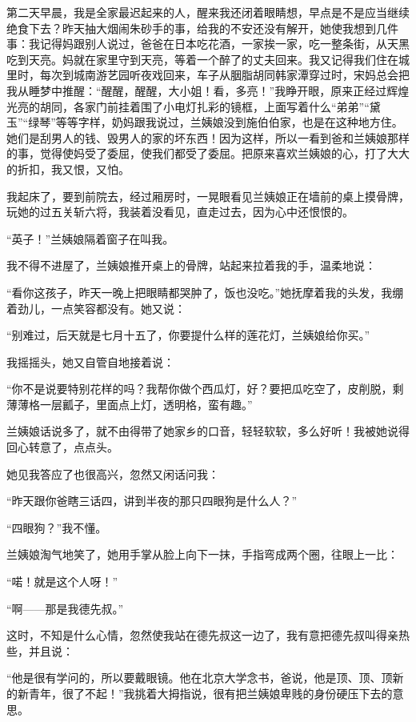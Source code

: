 \par 第二天早晨，我是全家最迟起来的人，醒来我还闭着眼睛想，早点是不是应当继续绝食下去？昨天抽大烟闹朱砂手的事，给我的不安还没有解开，她使我想到几件事：我记得妈跟别人说过，爸爸在日本吃花酒，一家挨一家，吃一整条街，从天黑吃到天亮。妈就在家里守到天亮，等着一个醉了的丈夫回来。我又记得我们住在城里时，每次到城南游艺园听夜戏回来，车子从胭脂胡同韩家潭穿过时，宋妈总会把我从睡梦中推醒：“醒醒，醒醒，大小姐！看，多亮！”我睁开眼，原来正经过辉煌光亮的胡同，各家门前挂着围了小电灯扎彩的镜框，上面写着什么“弟弟”“黛玉”“绿琴”等等字样，奶妈跟我说过，兰姨娘没到施伯伯家，也是在这种地方住。她们是刮男人的钱、毁男人的家的坏东西！因为这样，所以一看到爸和兰姨娘那样的事，觉得使妈受了委屈，使我们都受了委屈。把原来喜欢兰姨娘的心，打了大大的折扣，我又恨，又怕。
\par 我起床了，要到前院去，经过厢房时，一晃眼看见兰姨娘正在墙前的桌上摸骨牌，玩她的过五关斩六将，我装着没看见，直走过去，因为心中还恨恨的。
\par “英子！”兰姨娘隔着窗子在叫我。
\par 我不得不进屋了，兰姨娘推开桌上的骨牌，站起来拉着我的手，温柔地说：
\par “看你这孩子，昨天一晚上把眼睛都哭肿了，饭也没吃。”她抚摩着我的头发，我绷着劲儿，一点笑容都没有。她又说：
\par “别难过，后天就是七月十五了，你要提什么样的莲花灯，兰姨娘给你买。”
\par 我摇摇头，她又自管自地接着说：
\par “你不是说要特别花样的吗？我帮你做个西瓜灯，好？要把瓜吃空了，皮削脱，剩薄薄格一层瓤子，里面点上灯，透明格，蛮有趣。”
\par 兰姨娘话说多了，就不由得带了她家乡的口音，轻轻软软，多么好听！我被她说得回心转意了，点点头。
\par 她见我答应了也很高兴，忽然又闲话问我：
\par “昨天跟你爸瞎三话四，讲到半夜的那只四眼狗是什么人？”
\par “四眼狗？”我不懂。
\par 兰姨娘淘气地笑了，她用手掌从脸上向下一抹，手指弯成两个圈，往眼上一比：
\par “喏！就是这个人呀！”
\par “啊——那是我德先叔。”
\par 这时，不知是什么心情，忽然使我站在德先叔这一边了，我有意把德先叔叫得亲热些，并且说：
\par “他是很有学问的，所以要戴眼镜。他在北京大学念书，爸说，他是顶、顶、顶新的新青年，很了不起！”我挑着大拇指说，很有把兰姨娘卑贱的身份硬压下去的意思。

